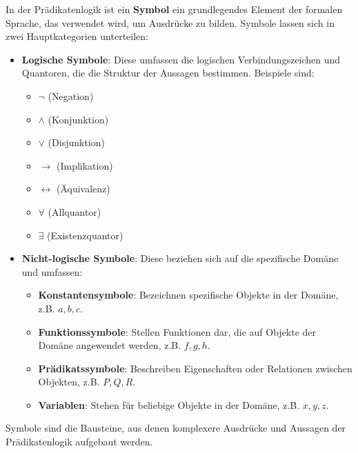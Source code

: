 \documentclass[main.tex]{subfiles}
\begin{document}
\begin{definition}[Symbol]
In der Prädikatenlogik ist ein \textbf{Symbol} ein grundlegendes Element der formalen Sprache, das verwendet wird, um Ausdrücke zu bilden. Symbole lassen sich in zwei Hauptkategorien unterteilen:

\begin{itemize}
    \item \textbf{Logische Symbole}: Diese umfassen die logischen Verbindungszeichen und Quantoren, die die Struktur der Aussagen bestimmen. Beispiele sind:
    \begin{itemize}
        \item \(\neg\) (Negation)
        \item \(\land\) (Konjunktion)
        \item \(\lor\) (Disjunktion)
        \item \(\rightarrow\) (Implikation)
        \item \(\leftrightarrow\) (Äquivalenz)
        \item \(\forall\) (Allquantor)
        \item \(\exists\) (Existenzquantor)
    \end{itemize}
    
    \item \textbf{Nicht-logische Symbole}: Diese beziehen sich auf die spezifische Domäne und umfassen:
    \begin{itemize}
        \item \textbf{Konstantensymbole}: Bezeichnen spezifische Objekte in der Domäne, z.B. \(a, b, c\).
        \item \textbf{Funktionssymbole}: Stellen Funktionen dar, die auf Objekte der Domäne angewendet werden, z.B. \(f, g, h\).
        \item \textbf{Prädikatssymbole}: Beschreiben Eigenschaften oder Relationen zwischen Objekten, z.B. \(P, Q, R\).
        \item \textbf{Variablen}: Stehen für beliebige Objekte in der Domäne, z.B. \(x, y, z\).
    \end{itemize}
\end{itemize}

Symbole sind die Bausteine, aus denen komplexere Ausdrücke und Aussagen der Prädikatenlogik aufgebaut werden.
\end{definition}
\end{document}

